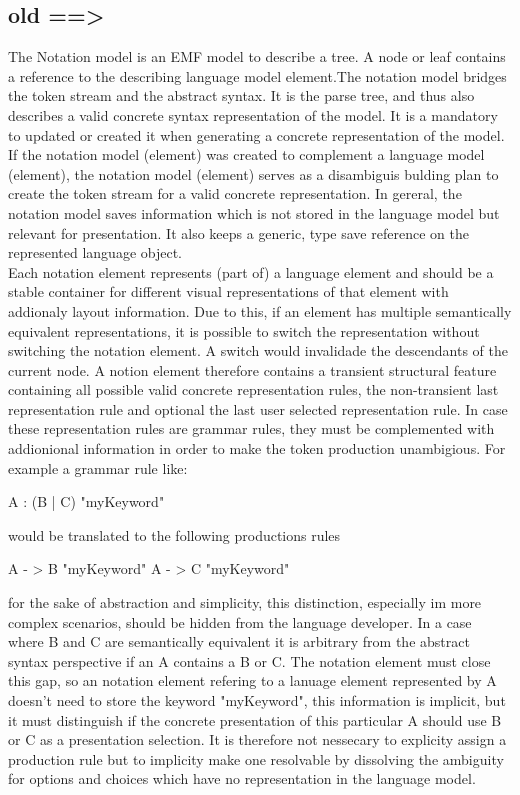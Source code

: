 \subsection{old ==>}
The Notation model is an EMF model to describe a tree. A node or leaf contains a reference to the describing language model element.The notation model bridges the token stream and the abstract syntax. It is the parse tree, and thus also describes a valid concrete syntax representation of the model.  It is a mandatory to updated or created it when generating a concrete representation of the model. If the notation model (element) was created to complement a language model (element), the notation model (element) serves as a disambiguis bulding plan to create the token stream for a valid concrete representation. In gereral, the notation model saves information which is not stored in the language model but relevant for presentation. It also keeps a generic, type save reference on the represented language object.\\
Each notation element represents (part of) a language element and should be a stable container for different visual representations of that element with addionaly layout information.  Due to this, if an element has multiple semantically equivalent representations, it is possible to switch the representation without switching the notation element. A switch would invalidade the descendants of the current node. A notion element therefore contains a transient structural feature containing all possible valid concrete representation rules, the non-transient last representation rule and optional the last user selected representation rule. In case these representation rules are grammar rules, they must be complemented with addionional information in order to make the token production unambigious. For example a grammar rule like:
\begin{xtxt}
A : (B | C) "myKeyword"
\end{xtxt}
would be translated to the following productions rules 
\begin{xtxt}
A - > B "myKeyword"
A - > C "myKeyword"
\end{xtxt}
for the sake of abstraction and simplicity, this distinction, especially im more complex scenarios, should be hidden from the language developer. In a case where B and C are semantically equivalent  it is arbitrary from the abstract syntax perspective if an A contains a B or C. The notation element must close this gap, so an notation element refering to a lanuage element represented by A doesn't need to store the keyword "myKeyword", this information is implicit, but it must distinguish if the concrete presentation of this particular A should use B or C as a presentation selection. It is therefore not nessecary to explicity assign  a production rule but to implicity make one resolvable by dissolving the ambiguity for options and choices which have no representation in the language model. \\
